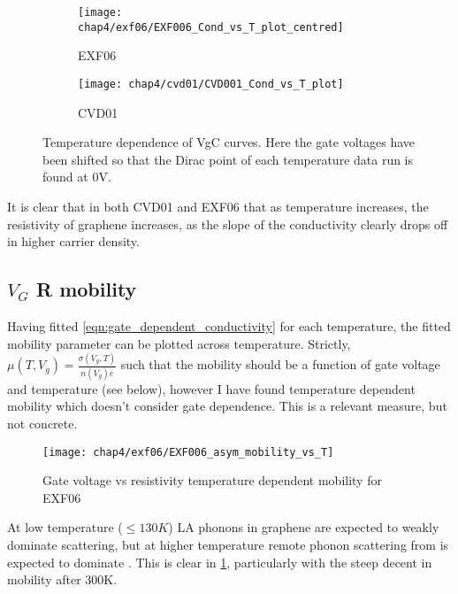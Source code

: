 \documentclass[../Matt_Gebert_Honours_Thesis.tex]{subfiles}
\begin{document}
\begin{figure}[H]
	\begin{subfigure}[b]{0.5\textwidth}
		\centering
		\texttt{[image: chap4/exf06/EXF006\_Cond\_vs\_T\_plot\_centred]}
		\caption{EXF06}
	\end{subfigure}
	\begin{subfigure}[b]{0.5\textwidth}
		\centering
		\texttt{[image: chap4/cvd01/CVD001\_Cond\_vs\_T\_plot]}
		\caption{CVD01}
	\end{subfigure}
	\caption[Changes in gate-voltage conductivity with temperature]{Temperature dependence of VgC curves. Here the gate voltages have been shifted so that the Dirac point of each temperature data run is found at 0V.}
\end{figure}

It is clear that in both CVD01 and EXF06 that as temperature increases, the resistivity of graphene increases, as the slope of the conductivity clearly drops off in higher carrier density.

\subsection{$V_G$ R mobility}

Having fitted \cref{eqn:gate_dependent_conductivity} for each temperature, the fitted mobility parameter can be plotted across temperature. Strictly, $\mu(T,V_g) = \frac{\sigma(V_g,T)}{n(V_g) e }$ such that the mobility should be a function of gate voltage and temperature (see below), however I have found temperature dependent mobility which doesn't consider gate dependence. This is a relevant measure, but not concrete.
\begin{figure}[H]
	\centering
	\texttt{[image: chap4/exf06/EXF006\_asym\_mobility\_vs\_T]}
	\caption{Gate voltage  vs resistivity temperature dependent mobility for EXF06}\label{fig:temp_mobility}
\end{figure}

At low temperature  ($\leq 130K$) LA phonons in graphene are expected to weakly dominate scattering, but at higher temperature remote phonon scattering from \silicondioxide{} is expected to dominate \cite{chen_intrinsic_2008}. This is clear in \cref{fig:temp_mobility}, particularly with the steep decent in mobility after 300K.
\end{document}
